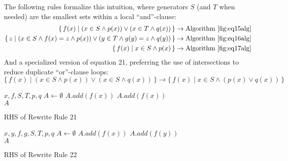 \documentclass{article}
\newcommand{\Set}[2]{%
  \{\, #1 \mid #2 \, \}%
}
\begin{document}
The following rules formalize this intuition, where generators $S$ (and $T$ when needed) are the smallest sets within a local ``and''-clause:
\begin{align}
  \Set{f(x)}{(x \in S \land p(x)) \lor (x \in T \land q(x))} &\rightarrow \text{Algorithm~\ref{fig:eq15alg}}\\
  \Set{z}{(x \in S \land f(x) = z \land p(x)) \lor (y \in T \land g(y) = z \land q(y))} &\rightarrow \text{Algorithm~\ref{fig:eq16alg}}\\
  \Set{f(x)}{x \in S \land p(x)} &\rightarrow \text{Algorithm~\ref{fig:eq17alg}}
\end{align}
And a specialized version of equation 21, preferring the use of intersections to reduce duplicate ``or''-clause loops:
\begin{equation}
  \Set{f(x)}{(x \in S \land p(x)) \lor (x \in S \land q(x))} \rightarrow \Set{f(x)}{x \in S \land (p(x) \lor q(x))}
\end{equation}


    \begin{algorithm}[h]
      \begin{algorithmic}
        \Require $x,f,S,T,p,q$
        \State $A \gets \emptyset$
            \State $A.add(f(x))$
          \EndIf
        \EndFor
            \State $A.add(f(x))$
          \EndIf
        \EndFor\\
      \Return $A$
      \end{algorithmic}
      \caption{RHS of Rewrite Rule 21}
      \label{fig:eq15alg}
    \end{algorithm}

    \begin{algorithm}[h]
      \begin{algorithmic}
        \Require $x,y,f,g,S,T,p,q$
        \State $A \gets \emptyset$
            \State $A.add(f(x))$
          \EndIf
        \EndFor
            \State $A.add(f(y))$
          \EndIf
        \EndFor\\
      \Return $A$
      \end{algorithmic}
      \caption{RHS of Rewrite Rule 22}
      \label{fig:eq16alg}
    \end{algorithm}
\end{document}
